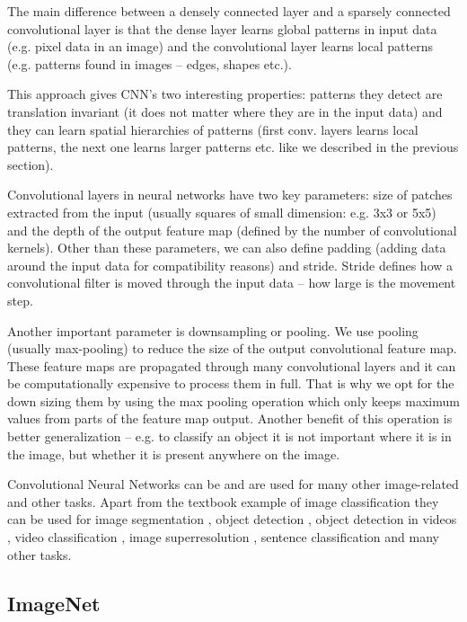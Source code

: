 \documentclass[b5paper]{book}
\let\cite\parencite
\begin{document}
The main difference between a densely connected layer and a sparsely connected convolutional layer is that the dense layer learns global patterns in input data (e.g. pixel data in an image) and the convolutional layer learns local patterns (e.g. patterns found in images -- edges, shapes etc.).

This approach gives CNN's two interesting properties: patterns they detect are translation invariant (it does not matter where they are in the input data) and they can learn spatial hierarchies of patterns (first conv. layers learns local patterns, the next one learns larger patterns etc. like we described in the previous section).

Convolutional layers in neural networks have two key parameters: size of patches extracted from the input (usually squares of small dimension: e.g. 3x3 or 5x5) and the depth of the output feature map (defined by the number of convolutional kernels). Other than these parameters, we can also define padding (adding data around the input data for compatibility reasons) and stride. Stride defines how a convolutional filter is moved through the input data -- how large is the movement step. 

Another important parameter is downsampling or pooling. We use pooling (usually max-pooling) to reduce the size of the output convolutional feature map. These feature maps are propagated through many convolutional layers and it can be computationally expensive to process them in full. That is why we opt for the down sizing them by using the max pooling operation which only keeps maximum values from parts of the feature map output. Another benefit of this operation is better generalization -- e.g. to classify an object it is not important where it is in the image, but whether it is present anywhere on the image.

Convolutional Neural Networks can be and are used for many other image-related and other tasks. Apart from the textbook example of image classification they can be used for image segmentation \cite{yang2017suggestive}, object detection \cite{redmon2016you}, object detection in videos \cite{ciaparrone2020deep}, video classification \cite{karpathy2014large}, image superresolution \cite{dong2015image}, sentence classification \cite{joulin2016bag} and many other tasks.

\subsection{ImageNet}
\end{document}
